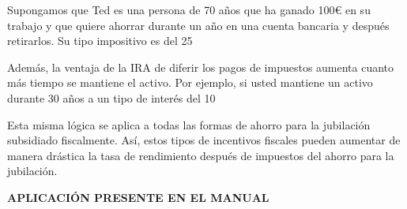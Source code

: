 \documentclass[10pt,a4paper]{article}
\begin{document}
Supongamos que Ted es una persona de 70 años que ha ganado 100€ en su trabajo y que quiere ahorrar durante un año en una cuenta bancaria y después retirarlos. Su tipo impositivo es del 25 %

Además, la ventaja de la IRA de diferir los pagos de impuestos aumenta cuanto más tiempo se mantiene el activo. Por ejemplo, si usted mantiene un activo durante 30 años a un tipo de interés del 10 %

Esta misma lógica se aplica a todas las formas de ahorro para la jubilación subsidiado fiscalmente. Así, estos tipos de incentivos fiscales pueden aumentar de manera drástica la tasa de rendimiento después de impuestos del ahorro para la jubilación.



\textbf{APLICACIÓN PRESENTE EN EL MANUAL}
\end{document}
